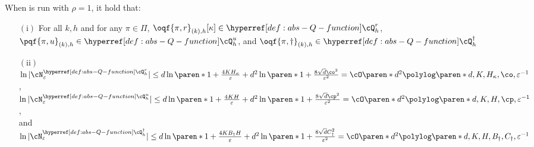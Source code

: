 \begin{lemma}[$Q$ covers]\label{lemma:Q eps covers}
When  is run with $\rho =1$, it hold that:
\begin{itemize}
\item[$(\mathrm{i})$] 
For all $k, h$ and for any $\pi \in \Pi$, 
\(\oqf{\pi, r}_{(k), h}[\kappa] \in \cQr_h\),
\(\pqf{\pi, u}_{(k), h} \in \cQu_h \),
and \(\oqf{\pi, \dagger}_{(k), h} \in \cQc_h \) 
\item[$(\mathrm{ii})$]
\(\ln |\cN^{\cQr_h}_{\varepsilon}| \leq d \ln \paren*{1+\frac{4 KH_\kappa }{\varepsilon}}+d^2 \ln \paren*{1+\frac{8 \sqrt{d} \co^2}{\varepsilon^2}} 
= \cO\paren*{d^2}\polylog\paren*{d,K,H_\kappa,\co,\varepsilon^{-1}}
\),\\
\(\ln |\cN^{\cQu_h}_{\varepsilon}| 
\leq d \ln \paren*{1+\frac{4 KH}{\varepsilon}}+d^2 \ln \paren*{1+\frac{8 \sqrt{d} \cp^2}{\varepsilon^2}}= \cO\paren*{d^2}\polylog\paren*{d,K,H,\cp,\varepsilon^{-1}}
\), \\
and \(\ln |\cN^{\cQc_h}_{\varepsilon}| 
\leq d \ln \paren*{1+\frac{4 KB_\dagger H}{\varepsilon}}+d^2 \ln \paren*{1+\frac{8 \sqrt{d} C_\dagger^2}{\varepsilon^2}}= \cO\paren*{d^2}\polylog\paren*{d, K, H, B_\dagger, C_\dagger,\varepsilon^{-1}}
\)
\end{itemize}
\end{lemma}
